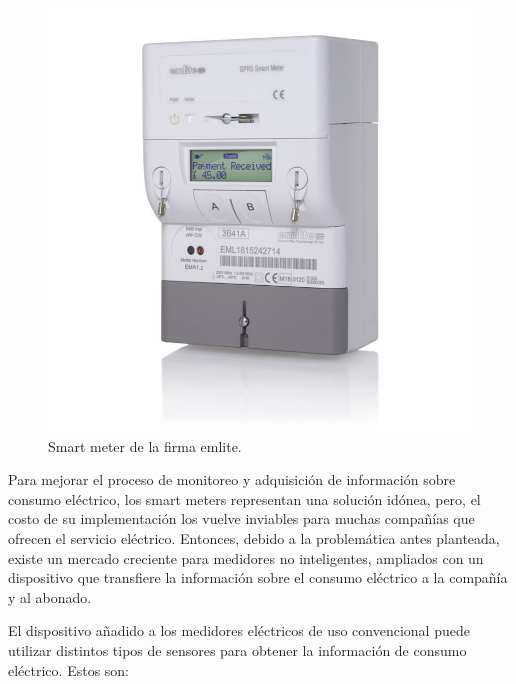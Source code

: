 \begin{figure}[h]
	\centering
	\includegraphics[scale=0.29]{./Figures/smart_meter.jpg}
	\caption{Smart meter de la firma emlite\protect\footnotemark.}
	\label{fig:cuadradoAzul}
\end{figure}


Para mejorar el proceso de monitoreo y adquisición de información sobre consumo eléctrico, los smart meters representan una solución idónea, pero, el costo de su implementación los vuelve inviables para muchas compañías que ofrecen el servicio eléctrico. Entonces, debido a la problemática antes planteada, existe un mercado creciente para medidores no inteligentes, ampliados con un dispositivo que transfiere la información sobre el consumo eléctrico a la compañía y al abonado.

El dispositivo añadido a los medidores eléctricos de uso convencional puede utilizar distintos tipos de sensores para obtener la información de consumo eléctrico. Estos son:

